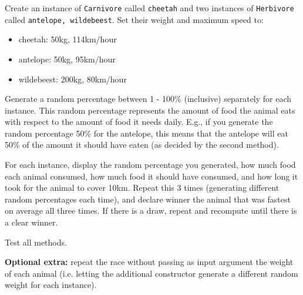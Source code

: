   Create an instance of \texttt{Carnivore} called \texttt{cheetah} and two instances of \texttt{Herbivore} called \texttt{antelope, wildebeest}. Set their weight and maximum speed to:
  \begin{itemize}
  \item cheetah: 50kg, 114km/hour
  \item antelope: 50kg, 95km/hour
  \item wildebeest: 200kg, 80km/hour
  \end{itemize}
  
  Generate a random percentage between 1 - 100\% (inclusive) separately for each instance. This random percentage represents the amount of food the animal eats with respect to the amount of food it needs daily. E.g., if you generate the random percentage 50\% for the antelope, this means that the antelope will eat 50\% of the amount it should have eaten (as decided by the second method). 
  
  For each instance, display the random percentage you generated, how much food each animal consumed, how much food it should have consumed, and how long it took for the animal to cover 10km. 
  Repeat this 3 times (generating different random percentages each time), and declare winner the animal that was fastest on average all three times. If there is a draw, repeat and recompute until there is a clear winner.
  
  Test all methods. %
  
  \textbf{Optional extra:} repeat the race without passing as input argument the weight of each animal (i.e. letting the additional constructor generate a different random weight for each instance).
